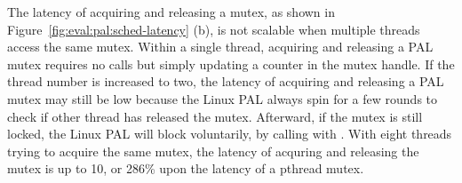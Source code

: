 The latency of acquiring and releasing a mutex,
as shown in Figure~\ref{fig:eval:pal:sched-latency} (b),
is not scalable when multiple threads
access the same mutex.
Within a single thread,
acquiring and releasing a PAL mutex requires no  calls
but simply updating a counter
in the mutex handle.
If the thread number is increased to two,
the latency of acquiring and releasing a PAL mutex may still be low
because
the Linux PAL always spin for a few rounds to check if
other thread has released the mutex.
Afterward, if the mutex is still locked,
the Linux PAL will block voluntarily,
by calling  with .
With eight threads trying to acquire the same mutex, the latency of acquring and releasing the mutex
is up to \roughly{}10\usec{}, or 286\% upon the latency of a pthread mutex.
 



